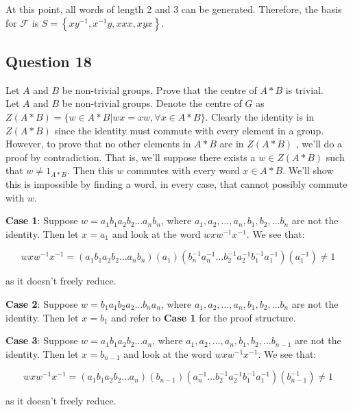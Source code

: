At this point, all words of length 2 and 3 can be generated. Therefore, the basis for $\mathcal{F}$ is $S=\left\{xy^{-1}, x^{-1}y, xxx, xyx\right\}$.

\subsection*{Question 18}

Let $A$ and $B$ be non-trivial groups. Prove that the centre of $A*B$ is trivial. \\

Let $A$ and $B$ be non-trivial groups. Denote the centre of $G$ as $Z(A*B)=\{ w \in A*B | wx=xw, \forall x \in A*B \}$. Clearly the identity is in $Z(A*B)$ since the identity must commute with every element in a group. However, to prove that no other elements in $A*B$ are in $Z(A*B)$ , we'll do a proof by contradiction. That is, we'll suppose there exists a $w\in Z(A*B)$ such that $w \neq 1_{A*B}$. Then this $w$ commutes with every word $x \in A*B$. We'll show this is impossible by finding a word, in every case, that cannot possibly commute with $w$.

\textbf{Case 1}: Suppose $w=a_{1}b_{1}a_{2}b_{2}\ldots a_{n}b_{n}$, where $a_1,a_2,\ldots ,a_n, b_1,b_2,\ldots b_n$ are not the identity. Then let $x=a_1$ and look at the word $wxw^{-1}x^{-1}$. We see that:

\begin{dmath}
wxw^{-1}x^{-1}=(a_{1}b_{1}a_{2}b_{2}\ldots a_{n}b_{n})(a_{1})(b_{n}^{-1}a_{n}^{-1}\ldots b_{2}^{-1}a_{2}^{-1}b_{1}^{-1}a_{1}^{-1})(a_{1}^{-1}) \neq 1
\end{dmath}

as it doesn't freely reduce.

\textbf{Case 2}: Suppose $w=b_{1}a_{1}b_{2}a_{2}\ldots b_{n}a_{n}$, where $a_1,a_2,\ldots ,a_n, b_1,b_2,\ldots b_n$ are not the identity. Then let $x=b_1$ and refer to \textbf{Case 1} for the proof structure. 

\textbf{Case 3}: Suppose $w=a_{1}b_{1}a_{2}b_{2}\ldots a_{n}$, where $a_1,a_2,\ldots ,a_n, b_1,b_2,\ldots b_{n-1}$ are not the identity. Then let $x=b_{n-1}$ and look at the word $wxw^{-1}x^{-1}$. We see that:

\begin{dmath}
wxw^{-1}x^{-1}=(a_{1}b_{1}a_{2}b_{2}\ldots a_{n})(b_{n-1})(a_{n}^{-1}\ldots b_{2}^{-1}a_{2}^{-1}b_{1}^{-1}a_{1}^{-1})(b_{n-1}^{-1}) \neq 1
\end{dmath}

as it doesn't freely reduce.

